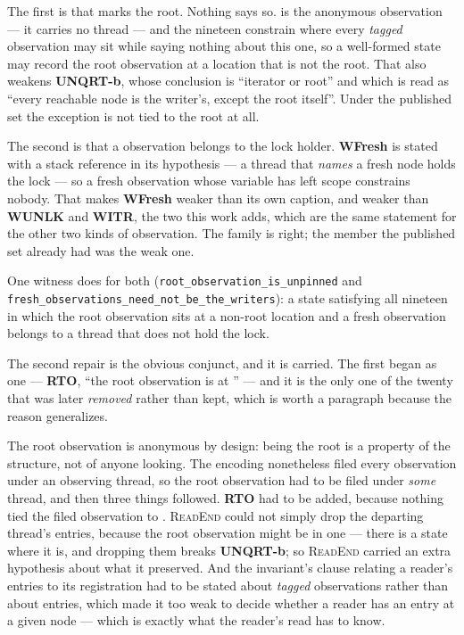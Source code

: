 The first is that \rt{} marks the root.  Nothing says so.  \rt{} is the
anonymous observation --- it carries no thread --- and the nineteen constrain
where every \emph{tagged} observation may sit while saying nothing about this
one, so a well-formed state may record the root observation at a location that
is not the root.  That also weakens \textbf{UNQRT-b}, whose conclusion is
``iterator or root'' and which is read as ``every reachable node is the
writer's, except the root itself''.  Under the published set the exception is
not tied to the root at all.

The second is that a \frsh{} observation belongs to the lock holder.
\textbf{WFresh} is stated with a stack reference in its hypothesis --- a thread
that \emph{names} a fresh node holds the lock --- so a fresh observation whose
variable has left scope constrains nobody.  That makes \textbf{WFresh} weaker
than its own caption, and weaker than \textbf{WUNLK} and \textbf{WITR}, the two
this work adds, which are the same statement for the other two kinds of
observation.  The family is right; the member the published set already had was
the weak one.

One witness does for both (\texttt{root\_observation\_is\_unpinned} and
\texttt{fresh\_observations\_need\_not\_be\_the\_writers}): a state satisfying
all nineteen in which the root observation sits at a non-root location and a
fresh observation belongs to a thread that does not hold the lock.

The second repair is the obvious conjunct, and it is carried.  The first began
as one --- \textbf{RTO}, ``the root observation is at \rt{}'' --- and it is the
only one of the twenty that was later \emph{removed} rather than kept, which is
worth a paragraph because the reason generalizes.

The root observation is anonymous by design: being the root is a property of
the structure, not of anyone looking.  The encoding nonetheless filed every
observation under an observing thread, so the root observation had to be filed
under \emph{some} thread, and then three things followed.  \textbf{RTO} had to
be added, because nothing tied the filed observation to \rt{}.  \textsc{ReadEnd}
could not simply drop the departing thread's entries, because the root
observation might be in one --- there is a state where it is, and dropping them
breaks \textbf{UNQRT-b}; so \textsc{ReadEnd} carried an extra hypothesis about
what it preserved.  And the invariant's clause relating a reader's entries to
its registration had to be stated about \emph{tagged} observations rather than
about entries, which made it too weak to decide whether a reader has an entry at
a given node --- which is exactly what the reader's read has to know.

